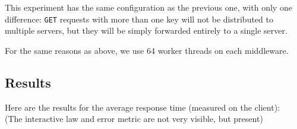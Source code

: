 \documentclass[11pt,a4paper]{article}
\renewcommand{\t}[1]{%
	{\texttt{#1}}}
\begin{document}
This experiment has the same configuration as the previous one, with only one difference: \t{GET} requests
with more than one key will not be distributed to multiple servers, but they will be simply forwarded
entirely to a single server.

For the same reasons as above, we use 64 worker threads on each middleware.


	
	

\subsection{Results}

Here are the results for the average response time (measured on the client):\\
(The interactive law and error metric are not very visible, but present)
\end{document}
